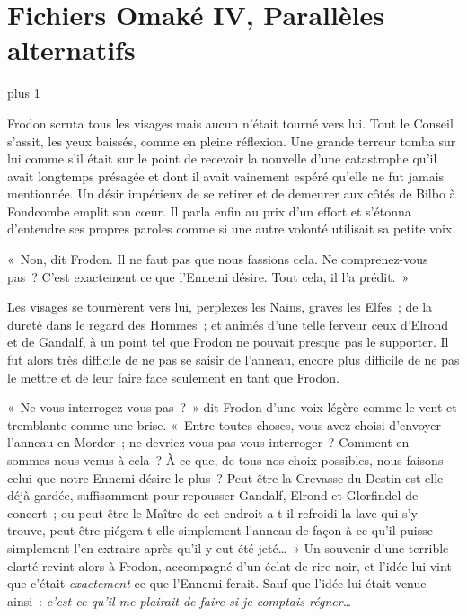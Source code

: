 
\makeatletter
\newcommand{\OmakeIVspecialsection}[2][1.5]{%
\vspace*{2\baselineskip plus 1\baselineskip minus 1\baselineskip}%
\noindent\hfill\scalebox{#1}{#2}\hfill\mbox{}%
\vskip 1\baselineskip plus 1\baselineskip%
\@afterindentfalse\@afterheading
}
\makeatother

\newcommand{\OmakeIVsection}[2][1.2]{%
  \OmakeIVspecialsection[#1]{\MakeUppercase{#2}}}

\chapter{Fichiers Omaké IV, Parallèles alternatifs}

\OmakeIVspecialsection[1.6]{\fontspec[ExternalLocation]{RingBearer}
\settowidth{\versewidth}{\mbox{Le}}
Seigneur\scalebox{.40}{\parbox[b]{\versewidth}{%
        \centering de\\\nointerlineskip\vskip 4pt la}}Rationalit\raisebox{.2ex}{É}}

Frodon scruta tous les visages mais aucun n'était tourné vers lui. Tout le Conseil s'assit, les yeux baissés, comme en pleine réflexion. Une grande terreur tomba sur lui comme s'il était sur le point de recevoir la nouvelle d'une catastrophe qu'il avait longtemps présagée et dont il avait vainement espéré qu'elle ne fut jamais mentionnée. Un désir impérieux de se retirer et de demeurer aux côtés de Bilbo à Fondcombe emplit son cœur. Il parla enfin au prix d'un effort et s'étonna d'entendre ses propres paroles comme si une autre volonté utilisait sa petite voix.

«~Non, dit Frodon. Il ne faut pas que nous fassions cela. Ne comprenez-vous pas~? C'est exactement ce que l'Ennemi désire. Tout cela, il l'a prédit.~»

Les visages se tournèrent vers lui, perplexes les Nains, graves les Elfes~; de la dureté dans le regard des Hommes~; et animés d'une telle ferveur ceux d'Elrond et de Gandalf, à un point tel que Frodon ne pouvait presque pas le supporter. Il fut alors très difficile de ne pas se saisir de l'anneau, encore plus difficile de ne pas le mettre et de leur faire face seulement en tant que Frodon.

«~Ne vous interrogez-vous pas~?~» dit Frodon d'une voix légère comme le vent et tremblante comme une brise. «~Entre toutes choses, vous avez choisi d'envoyer l'anneau en Mordor~; ne devriez-vous pas vous interroger~? Comment en sommes-nous venus à cela~? À ce que, de tous nos choix possibles, nous faisons celui que notre Ennemi désire le plus~? Peut-être la Crevasse du Destin est-elle déjà gardée, suffisamment pour repousser Gandalf, Elrond et Glorfindel de concert~; ou peut-être le Maître de cet endroit a-t-il refroidi la lave qui s'y trouve, peut-être piégera-t-elle simplement l'anneau de façon à ce qu'il puisse simplement l'en extraire après qu'il y eut été jeté…~» Un souvenir d'une terrible clarté revint alors à Frodon, accompagné d'un éclat de rire noir, et l'idée lui vint que c'était \emph{exactement} ce que l'Ennemi ferait. Sauf que l'idée lui était venue ainsi~: \emph{c'est ce qu'il me plairait de faire si je comptais régner…}

